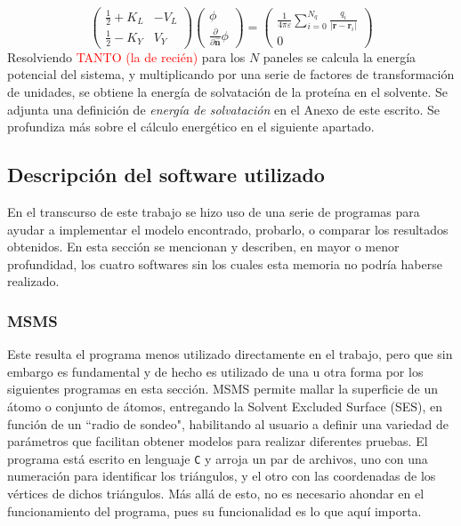 \documentclass[12pt, notitlepage]{article}
\numberwithin{equation}{section}
\begin{document}
\begin{equation}
	\renewcommand\arraystretch{1.6}
	\begin{pmatrix}
		\frac{1}{2} + K_L & -V_L \\ \frac{1}{2} - K_Y & V_Y
	\end{pmatrix}
	\begin{pmatrix}
		\phi \\ \frac{\partial}{\partial\hat{\mathbf{n}}}\phi
	\end{pmatrix}
	=
	\begin{pmatrix}
		\frac{1}{4\pi\varepsilon}\sum_{i=0}^{N_q}\frac{q_i}{|\mathbf{r} - \mathbf{r}_i|} \\ 0
	\end{pmatrix}
\end{equation}
Resolviendo \textcolor{red}{TANTO (la de recién)} para los $N$ paneles se calcula la energía potencial del sistema, y multiplicando por una serie de factores de transformación de unidades, se obtiene la energía de solvatación de la proteína en el solvente. Se adjunta una definición de \textit{energía de solvatación} en el Anexo de este escrito. Se profundiza más sobre el cálculo energético en el siguiente apartado.






\subsection{Descripción del software utilizado}
En el transcurso de este trabajo se hizo uso de una serie de programas para ayudar a implementar el modelo encontrado, probarlo, o comparar los resultados obtenidos. En esta sección se mencionan y describen, en mayor o menor profundidad, los cuatro softwares sin los cuales esta memoria no podría haberse realizado.

\subsubsection{MSMS}
Este resulta el programa menos utilizado directamente en el trabajo, pero que sin embargo es fundamental y de hecho es utilizado de una u otra forma por los siguientes programas en esta sección. MSMS permite mallar la superficie de un átomo o conjunto de átomos, entregando la Solvent Excluded Surface (SES), en función de un ``radio de sondeo", habilitando al usuario a definir una variedad de parámetros que facilitan obtener modelos para realizar diferentes pruebas. El programa está escrito en lenguaje \texttt{C} y arroja un par de archivos, uno con una numeración para identificar los triángulos, y el otro con las coordenadas de los vértices de dichos triángulos. Más allá de esto, no es necesario ahondar en el funcionamiento del programa, pues su funcionalidad es lo que aquí importa.
\end{document}
